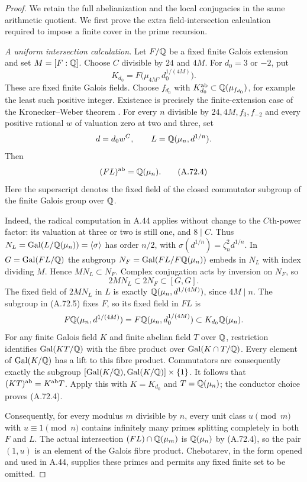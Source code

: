 \begin{proof}
We retain the full abelianization and the local conjugacies in the
same arithmetic quotient.  We first prove the extra field-intersection
calculation required to impose a finite cover in the prime recursion.

\emph{A uniform intersection calculation.}
Let $F/\mathbb Q$ be a fixed finite Galois extension and set $M=[F:\mathbb Q]$.
Choose $C$ divisible by $24$ and $4M$.  For $d_0=3$ or $-2$, put
\[
 K_{d_0}=F\bigl(\mu_{4M},d_0^{1/(4M)}\bigr).
\tag{A.72.3}
\]
These are fixed finite Galois fields.  Choose $f_{d_0}$ with
$K_{d_0}^{\rm ab}\subset\mathbb Q(\mu_{f_{d_0}})$, for example the least
such positive integer.  Existence is precisely the finite-extension
case of the Kronecker--Weber theorem
\cite[I, Theorem 4.16, pp.~49--50]{MilneCFT}.
For every $n$ divisible by $24,4M,f_3,f_{-2}$ and every positive
rational $w$ of valuation zero at two and three, set
\[
 d=d_0w^C,\qquad L=\mathbb Q(\mu_n,d^{1/n}).
\]
Then
\[
                         (FL)^{\rm ab}=\mathbb Q(\mu_n).
\tag{A.72.4}
\]
Here the superscript denotes the fixed field of the closed
commutator subgroup of the finite Galois group over $\mathbb Q$.

Indeed, the radical computation in A.44 applies without change to
the $C$th-power factor: its valuation at three or two is still one,
and $8\mid C$.  Thus
$N_L=\operatorname{Gal}(L/\mathbb Q(\mu_n))=\langle\sigma\rangle$
has order $n/2$, with $\sigma(d^{1/n})=\zeta_n^2d^{1/n}$.
In $G=\operatorname{Gal}(FL/\mathbb Q)$ the subgroup
$N_F=\operatorname{Gal}(FL/F\mathbb Q(\mu_n))$ embeds in $N_L$ with
index dividing $M$.  Hence $MN_L\subset N_F$.
Complex conjugation acts by inversion on $N_F$, so
\[
                 2MN_L\subset2N_F\subset[G,G].
\tag{A.72.5}
\]
The fixed field of $2MN_L$ in $L$ is exactly
$\mathbb Q(\mu_n,d^{1/(4M)})$, since $4M\mid n$.
The subgroup in (A.72.5) fixes $F$, so its fixed field in $FL$ is
\[
 F\mathbb Q(\mu_n,d^{1/(4M)})
   =F\mathbb Q(\mu_n,d_0^{1/(4M)})\subset K_{d_0}\mathbb Q(\mu_n).
\]
For any finite Galois field $K$ and finite abelian field $T$ over
$\mathbb Q$, restriction identifies $\operatorname{Gal}(KT/\mathbb Q)$ with the
fibre product over $\operatorname{Gal}(K\cap T/\mathbb Q)$.
Every element of $\operatorname{Gal}(K/\mathbb Q)$ has a lift to this
fibre product.  Commutators are consequently exactly the subgroup
$[\operatorname{Gal}(K/\mathbb Q),\operatorname{Gal}(K/\mathbb Q)]\times\{1\}$.
It follows that $(KT)^{\rm ab}=K^{\rm ab}T$.
Apply this with $K=K_{d_0}$ and $T=\mathbb Q(\mu_n)$; the conductor
choice proves (A.72.4).

Consequently, for every modulus $m$ divisible by $n$, every unit
class $u\pmod m$ with $u\equiv1\pmod n$ contains infinitely many
primes splitting completely in both $F$ and $L$.
The actual intersection $(FL)\cap\mathbb Q(\mu_m)$ is $\mathbb Q(\mu_n)$
by (A.72.4), so the pair $(1,u)$ is an element of the Galois
fibre product.  Chebotarev, in the form opened and used in A.44,
supplies these primes and permits any fixed finite set to be omitted.


\end{proof}
